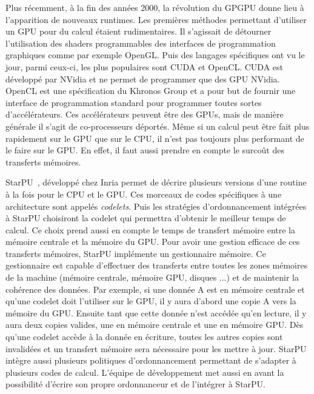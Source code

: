 Plus récemment, à la fin des années 2000, la révolution du GPGPU donne lieu à l'apparition de nouveaux runtimes.
%
Les premières méthodes permettant d'utiliser un GPU pour du calcul étaient rudimentaires.
%
Il s'agissait de détourner l'utilisation des shaders programmables des interfaces de programmation graphiques comme par exemple OpenGL.
%
Puis des langages spécifiques ont vu le jour, parmi ceux-ci, les plus populaires sont CUDA et OpenCL.
%
CUDA est développé par NVidia et ne permet de programmer que des GPU NVidia.
%
OpenCL est une spécification du Khronos Group et a pour but de fournir une interface de programmation standard pour programmer toutes sortes d'accélérateurs.
%
Ces accélérateurs peuvent être des GPUs, mais de manière générale il s'agit de co-processeurs déportés.
%
Même si un calcul peut être fait plus rapidement sur le GPU que sur le CPU, il n'est pas toujours plus performant de le faire sur le GPU.
%
En effet, il faut aussi prendre en compte le surcoût des transferts mémoires.



StarPU~\cite{starpu}, développé chez Inria permet de décrire plusieurs versions d'une routine à la fois pour le CPU et le GPU.
%
Ces morceaux de codes spécifiques à une architecture sont appelés {\em codelets}.
%
Puis les stratégies d'ordonnancement intégrées à StarPU choisiront la codelet qui permettra d'obtenir le meilleur temps de calcul.
%
Ce choix prend aussi en compte le temps de transfert mémoire entre la mémoire centrale et la mémoire du GPU.
%
Pour avoir une gestion efficace de ces transferts mémoires, StarPU implémente un gestionnaire mémoire.
%
Ce gestionnaire est capable d'effectuer des transferts entre toutes les zones mémoires de la machine (mémoire centrale, mémoire GPU, disques ...) et de maintenir la cohérence des données.
%
Par exemple, si une donnée A est en mémoire centrale et qu'une codelet doit l'utiliser sur le GPU, il y aura d'abord une copie A vers la mémoire du GPU.
%
Ensuite tant que cette donnée n'est accédée qu'en lecture, il y aura deux copies valides, une en mémoire centrale et une en mémoire GPU.
%
Dès qu'une codelet accède à la donnée en écriture, toutes les autres copies sont invalidées et un transfert mémoire sera nécessaire pour les mettre à jour.
%
StarPU intègre aussi plusieurs politiques d'ordonnancement permettant de s'adapter à plusieurs codes de calcul.
%
L'équipe de développement met aussi en avant la possibilité d'écrire son propre ordonnanceur et de l'intégrer à StarPU.



